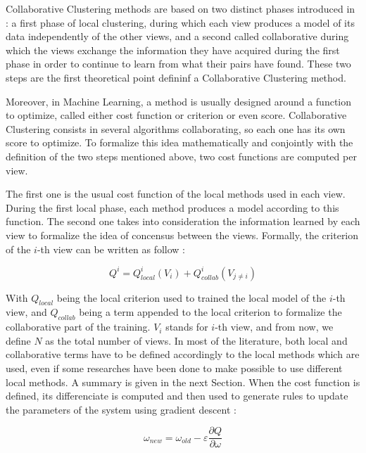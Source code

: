 \documentclass[a4paper]{report}
\begin{document}
    Collaborative Clustering methods are based on two distinct phases introduced in \cite{pedrycz2002collaborative} : a first phase of local clustering, during which each view produces a model of its data independently of the other views, and a second called collaborative during which the views exchange the information they have acquired during the first phase in order to continue to learn from what their pairs have found. These two steps are the first theoretical point defininf a Collaborative Clustering method.

    Moreover, in Machine Learning, a method is usually designed around a function to optimize, called either cost function or criterion or even score. Collaborative Clustering consists in several algorithms collaborating, so each one has its own score to optimize. To formalize this idea mathematically and conjointly with the definition of the two steps mentioned above, two cost functions are computed per view.

    The first one is the usual cost function of the local methods used in each view. During the first local phase, each method produces a model according to this function. The second one takes into consideration the information learned by each view to formalize the idea of concensus between the views. Formally, the criterion of the $i$-th view can be written as follow :

    \begin{equation}
        Q^i = Q^i_{local}(V_i) + Q^i_{collab}(V_{j\neq i})
    \end{equation}

    With $Q_{local}$ being the local criterion used to trained the local model of the $i$-th view, and $Q_{collab}$ being a term appended to the local criterion to formalize the collaborative part of the training. $V_i$ stands for $i$-th view, and from now, we define $N$ as the total number of views. In most of the literature, both local and collaborative terms have to be defined accordingly to the local methods which are used, even if some researches have been done to make possible to use different local methods. A summary is given in the next Section. When the cost function is defined, its differenciate is computed and then used to generate rules to update the parameters of the system using gradient descent : 
    
    \begin{equation}
        \omega_{new} = \omega_{old} - \varepsilon \frac{\partial Q}{\partial \omega}
        \label{eq:gradient_descent}
    \end{equation}
    
\end{document}
